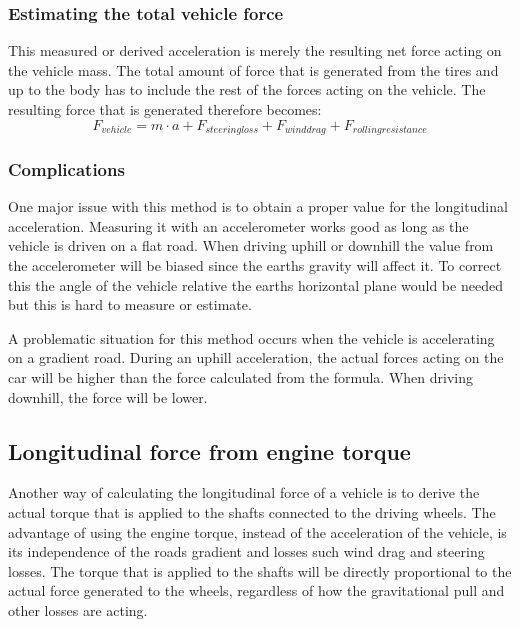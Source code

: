 \subsubsection{Estimating the total vehicle force}
This measured or derived acceleration is merely the resulting net force acting on the vehicle mass. The total amount of force that is generated from the tires and up to the body has to include the rest of the forces acting on the vehicle. The resulting force that is generated therefore becomes: 
\begin{equation}
F_{vehicle} = m \cdot a + F_{steering loss} + F_{wind drag} + F_{rolling resistance}
\end{equation}

\subsubsection{Complications}
One major issue with this method is to obtain a proper value for the longitudinal acceleration. Measuring it with an accelerometer works good as long as the vehicle is driven on a flat road. When driving uphill or downhill the value from the accelerometer will be biased since the earths gravity will affect it. To correct this the angle of the vehicle relative the earths horizontal plane would be needed but this is hard to measure or estimate. 


A problematic situation for this method occurs when the vehicle is accelerating on a gradient road. During an uphill acceleration, the actual forces acting on the car will be higher than the force calculated from the formula. When driving downhill, the force will be lower.


\subsection{Longitudinal force from engine torque}

Another way of calculating the longitudinal force of a vehicle is to derive the actual torque that is applied to the shafts connected to the driving wheels. The advantage of using the engine torque, instead of the acceleration of the vehicle, is its independence of the roads gradient and losses such wind drag and steering losses. The torque that is applied to the shafts will be directly proportional to the actual force generated to the wheels, regardless of how the gravitational pull and other losses are acting. 

